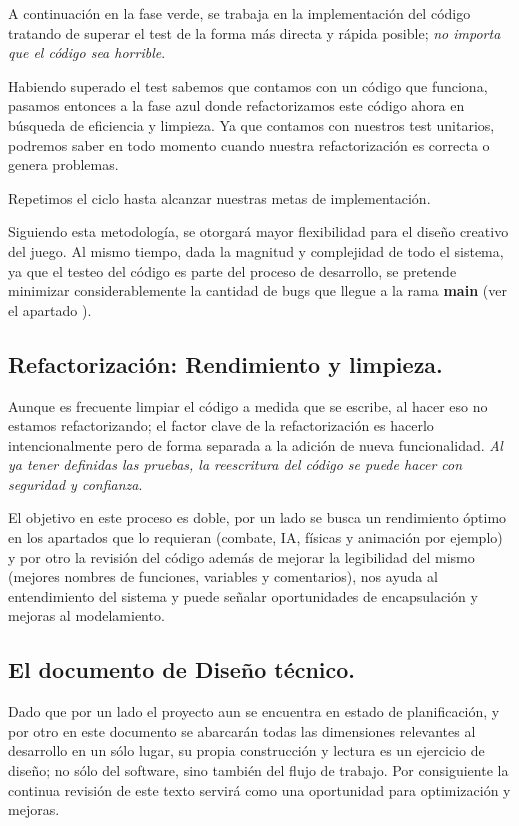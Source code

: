 A continuación en la fase verde, se trabaja en la implementación del código tratando de superar el test de la forma más directa y rápida posible; \textit{no importa que el código sea horrible}.

Habiendo superado el test sabemos que contamos con un código que funciona, pasamos entonces a la fase azul donde refactorizamos este código ahora en búsqueda de eficiencia y limpieza. Ya que contamos con nuestros test unitarios, podremos saber en todo momento cuando nuestra refactorización es correcta o genera problemas.

Repetimos el ciclo hasta alcanzar nuestras metas de implementación.

Siguiendo esta metodología, se otorgará mayor flexibilidad para el diseño creativo del juego. Al mismo tiempo, dada la magnitud y complejidad de todo el sistema, ya que el testeo del código es parte del proceso de desarrollo, se pretende minimizar considerablemente la cantidad de bugs que llegue a la rama \textbf{main} (ver el apartado ).

\subsection{Refactorización: Rendimiento y limpieza.}\label{principios:refactorizacion-rendimiento-limpieza}
Aunque es frecuente limpiar el código a medida que se escribe, al hacer eso no estamos refactorizando; el factor clave de la refactorización es hacerlo intencionalmente pero de forma separada a la adición de nueva funcionalidad. \emph{Al ya tener definidas las pruebas, la reescritura del código se puede hacer con seguridad y confianza}.

El objetivo en este proceso es doble, por un lado se busca un rendimiento óptimo en los apartados que lo requieran (combate, IA, físicas y animación por ejemplo) y por otro la revisión del código además de mejorar la legibilidad del mismo (mejores nombres de funciones, variables y comentarios), nos ayuda al entendimiento del sistema y puede señalar oportunidades de encapsulación y mejoras al modelamiento.

\subsection{El documento de Diseño técnico.}\label{principios:documento-de-diseno}
Dado que por un lado el proyecto aun se encuentra en estado de planificación, y por otro en este documento se abarcarán todas las dimensiones relevantes al desarrollo en un sólo lugar, su propia construcción y lectura es un ejercicio de diseño; no sólo del software, sino también del flujo de trabajo. Por consiguiente la continua revisión de este texto servirá como una oportunidad para optimización y mejoras.

